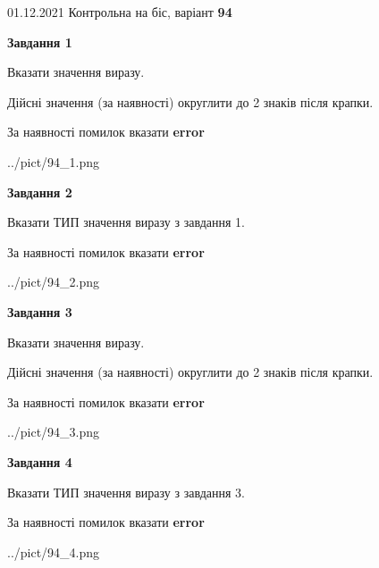 \documentclass[11pt, ukrainian]{article}
\begin{document}
{01.12.2021 Контрольна на біс, варіант  \No \textbf { 94 }\par}
{
\begin {large}
{\begin {center}\textbf{Завдання 1}\end {center}}\par
Вказати значення виразу. \par
Дійсні значення (за наявності) округлити до 2 знаків після крапки. \par
За наявності помилок вказати \textbf{error}

\begin{center}
	{../pict/94_1.png}
\end{center}
\newpage

{\begin {center}\textbf{Завдання 2}\end {center}}\par
Вказати ТИП значення виразу з завдання 1. \par
За наявності помилок вказати \textbf{error}

\begin{center}
	{../pict/94_2.png}
\end{center}
\newpage

{\begin {center}\textbf{Завдання 3}\end {center}}\par
Вказати значення виразу. \par
Дійсні значення (за наявності) округлити до 2 знаків після крапки. \par
За наявності помилок вказати \textbf{error}

\begin{center}
	{../pict/94_3.png}
\end{center}
\newpage

{\begin {center}\textbf{Завдання 4}\end {center}}\par
Вказати ТИП значення виразу з завдання 3. \par
За наявності помилок вказати \textbf{error}

\begin{center}
	{../pict/94_4.png}
\end{center}
\newpage


\end{large}}
\end{document}
